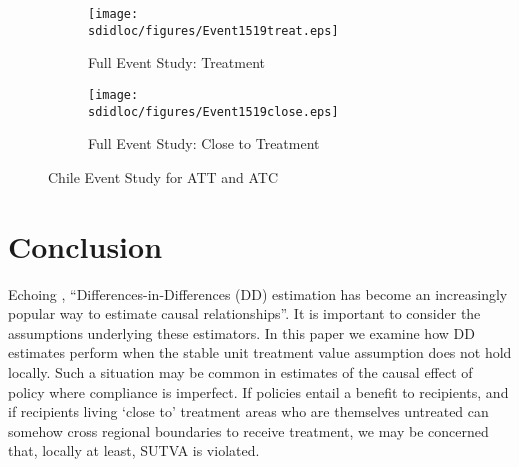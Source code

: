 \begin{figure}[htpb!]
\begin{center}
\begin{subfigure}{.5\textwidth}
  \centering
  \texttt{[image: \\sdidloc/figures/Event1519treat.eps]}
  \caption{Full Event Study: Treatment}
  \label{Sfig:eventT}
\end{subfigure}%
\begin{subfigure}{.5\textwidth}
  \centering
  \texttt{[image: \\sdidloc/figures/Event1519close.eps]}
  \caption{Full Event Study: Close to Treatment}
  \label{Sfig:eventC}
\end{subfigure}
\caption{Chile Event Study for ATT and ATC}
\label{Sfig:eventStudy}
\end{center}
\end{figure}



\section{Conclusion}
Echoing \citet{Bertrandetal2004}, ``Differences-in-Differences (DD) estimation 
has become an increasingly popular way to estimate causal relationships''.  
It is important to consider the assumptions underlying these estimators.  
In this paper we examine how DD estimates perform when the stable unit treatment 
value assumption does not hold locally.  Such a situation may be common in 
estimates of the causal effect of policy where compliance is imperfect. If 
policies entail a benefit to recipients, and if recipients living `close to' 
treatment areas who are themselves untreated can somehow cross regional 
boundaries to receive treatment, we may be concerned that, locally at least, 
SUTVA is violated.

